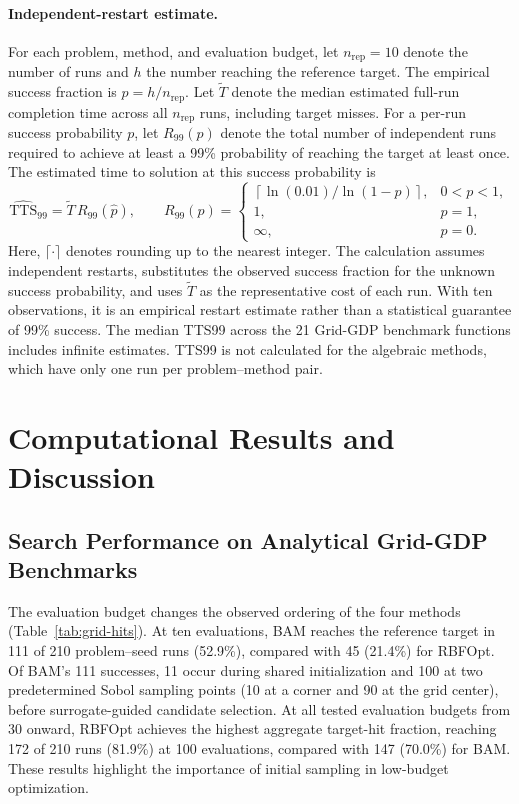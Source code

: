 \documentclass{article}
\begin{document}
\paragraph{Independent-restart estimate.}
For each problem, method, and evaluation budget, let $n_{\mathrm{rep}}=10$ denote the number of runs and $h$ the number reaching the reference target.
The empirical success fraction is $\widehat p=h/n_{\mathrm{rep}}$.
Let $\widetilde T$ denote the median estimated full-run completion time across all $n_{\mathrm{rep}}$ runs, including target misses.
For a per-run success probability $p$, let $R_{99}(p)$ denote the total number of independent runs required to achieve at least a 99\% probability of reaching the target at least once.
The estimated time to solution at this success probability is
\begin{equation}\label{eqn:tts}
 \widehat{\mathrm{TTS}}_{99}
 =\widetilde T\,R_{99}(\widehat p),\qquad
 R_{99}(p)=
 \begin{cases}
 \left\lceil\ln(0.01)/\ln(1-p)\right\rceil,&0<p<1,\\
 1,&p=1,\\
 \infty,&p=0.
 \end{cases}
\end{equation}
Here, $\lceil\cdot\rceil$ denotes rounding up to the nearest integer.
The calculation assumes independent restarts, substitutes the observed success fraction for the unknown success probability, and uses $\widetilde T$ as the representative cost of each run.
With ten observations, it is an empirical restart estimate rather than a statistical guarantee of 99\% success.
The median TTS99 across the 21 Grid-GDP benchmark functions includes infinite estimates.
TTS99 is not calculated for the algebraic methods, which have only one run per problem--method pair.

\section{Computational Results and Discussion}
\label{sec:results}

\subsection{Search Performance on Analytical Grid-GDP Benchmarks}
\label{sec:grid-search-results}
The evaluation budget changes the observed ordering of the four methods (Table~\ref{tab:grid-hits}).
At ten evaluations, BAM reaches the reference target in 111 of 210 problem--seed runs (52.9\%), compared with 45 (21.4\%) for RBFOpt.
Of BAM's 111 successes, 11 occur during shared initialization and 100 at two predetermined Sobol sampling points (10 at a corner and 90 at the grid center), before surrogate-guided candidate selection.
At all tested evaluation budgets from 30 onward, RBFOpt achieves the highest aggregate target-hit fraction, reaching 172 of 210 runs (81.9\%) at 100 evaluations, compared with 147 (70.0\%) for BAM.
These results highlight the importance of initial sampling in low-budget optimization.
\end{document}
